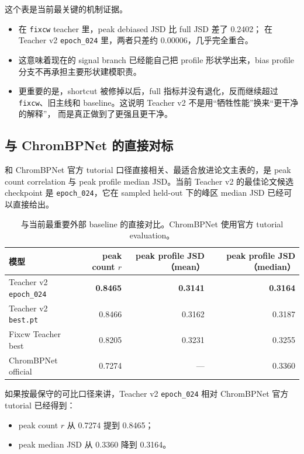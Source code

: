 \documentclass[11pt,a4paper]{ctexart}
\begin{document}
这个表是当前最关键的机制证据。

\begin{itemize}[leftmargin=2em]
  \item 在 \texttt{fixcw} teacher 里，peak debiased JSD 比 full JSD 差了 0.2402；
  在 Teacher v2 \texttt{epoch\_024} 里，两者只差约 0.00006，几乎完全重合。

  \item 这意味着现在的 signal branch 已经能自己把 profile 形状学出来，bias profile
  分支不再承担主要形状建模职责。

  \item 更重要的是，shortcut 被修掉以后，full 指标并没有退化，反而继续超过
  \texttt{fixcw}、旧主线和 baseline。这说明 Teacher v2 不是用“牺牲性能”换来“更干净的解释”，
  而是真正做到了更强且更干净。
\end{itemize}

\subsection{与 ChromBPNet 的直接对标}

和 ChromBPNet 官方 tutorial 口径直接相关、最适合放进论文主表的，是 peak count correlation
与 peak profile median JSD。当前 Teacher v2 的最佳论文候选 checkpoint 是
\texttt{epoch\_024}，它在 sampled held-out 下的峰区 median JSD 已经可以直接给出。

\begin{table}[H]
\centering
\small
\caption{与当前最重要外部 baseline 的直接对比。ChromBPNet 使用官方 tutorial evaluation。}
\begin{tabular}{lrrr}
\toprule
模型 & peak count $r$ & peak profile JSD（mean） & peak profile JSD（median） \\
\midrule
Teacher v2 \texttt{epoch\_024} & \textbf{0.8465} & \textbf{0.3141} & \textbf{0.3164} \\
Teacher v2 \texttt{best.pt} & 0.8466 & 0.3162 & 0.3187 \\
Fixcw Teacher best & 0.8205 & 0.3231 & 0.3255 \\
ChromBPNet official & 0.7274 & --- & 0.3360 \\
\bottomrule
\end{tabular}
\end{table}

如果按最保守的可比口径来讲，Teacher v2 \texttt{epoch\_024} 相对 ChromBPNet 官方 tutorial
已经得到：
\begin{itemize}[leftmargin=2em]
  \item peak count $r$ 从 0.7274 提到 0.8465；
  \item peak median JSD 从 0.3360 降到 0.3164。
\end{itemize}
\end{document}

